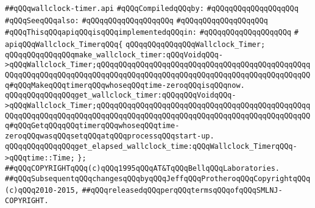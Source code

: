 \label{src/lib/std/src/wallclock-timer.api}
\verb|##qQQqwallclock-timer.api|\newline
\newline
\verb|#qQQqCompiledqQQqby:|\newline
\verb|#qQQqqQQqqQQqqQQqqQQq|\newline
\newline
\verb|#qQQqSeeqQQqalso:|\newline
\verb|#qQQqqQQqqQQqqQQqqQQq|\newline
\verb|#qQQqqQQqqQQqqQQqqQQq|\newline
\newline
\verb|#qQQqThisqQQqapiqQQqisqQQqimplementedqQQqin:|\newline
\verb|#qQQqqQQqqQQqqQQqqQQq|\newline
\verb|#|\newline
\verb|apiqQQqWallclock_TimerqQQq{|\newline
\newline
\verb|qQQqqQQqqQQqqQQqWallclock_Timer;|\newline
\newline
\verb|qQQqqQQqqQQqqQQqmake_wallclock_timer:qQQqVoidqQQq->qQQqWallclock_Timer;qQQqqQQqqQQqqQQqqQQqqQQqqQQqqQQqqQQqqQQqqQQqqQQqqQQqqQQqqQQqqQQqqQQqqQQqqQQqqQQqqQQqqQQqqQQqqQQqqQQqqQQqqQQqqQQqqQQqqQQq#qQQqMakeqQQqtimerqQQqwhoseqQQqtime-zeroqQQqisqQQqnow.|\newline
\verb|qQQqqQQqqQQqqQQqget_wallclock_timer:qQQqqQQqVoidqQQq->qQQqWallclock_Timer;qQQqqQQqqQQqqQQqqQQqqQQqqQQqqQQqqQQqqQQqqQQqqQQqqQQqqQQqqQQqqQQqqQQqqQQqqQQqqQQqqQQqqQQqqQQqqQQqqQQqqQQqqQQqqQQqqQQqqQQq#qQQqGetqQQqqQQqtimerqQQqwhoseqQQqtime-zeroqQQqwasqQQqsetqQQqatqQQqprocessqQQqstart-up.|\newline
\newline
\verb|qQQqqQQqqQQqqQQqget_elapsed_wallclock_time:qQQqWallclock_TimerqQQq->qQQqtime::Time;|\newline
\verb|};|\newline
\newline
\newline
\verb|##qQQqCOPYRIGHTqQQq(c)qQQq1995qQQqAT&TqQQqBellqQQqLaboratories.|\newline
\verb|##qQQqSubsequentqQQqchangesqQQqbyqQQqJeffqQQqProtheroqQQqCopyrightqQQq(c)qQQq2010-2015,|\newline
\verb|##qQQqreleasedqQQqperqQQqtermsqQQqofqQQqSMLNJ-COPYRIGHT.|\newline

